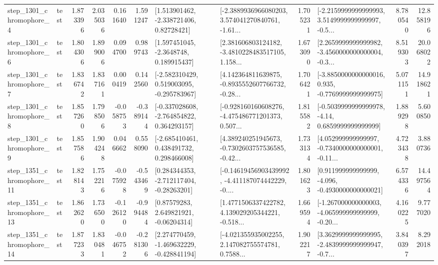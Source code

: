 \begin{tabular}{llrrrrllrlrr}
  step\_1301\_chromophore\_4 &      test &      1.873396 &    2.035036 &      0.161640 &  1.591247 &     [1.513901462, -2.338721406, 0.82728421] &  [-2.3889936966080203, 3.574041270840761, -1.61... &       1.705231 &  [-2.2159999999999993, 3.5149999999999997, -0.5... &            8.780540 &         12.858196 \\
  step\_1301\_chromophore\_6 &      test &      1.804306 &    1.899006 &      0.094700 &  0.989743 &      [1.597451045, -2.3648748, 0.189915437] &  [2.381606803124182, -3.4810228483517105, 1.158... &       1.673090 &  [2.2659999999999982, -3.4560000000000004, -0.3... &            8.519303 &         20.068022 \\
  step\_1301\_chromophore\_7 &      test &      1.836742 &    1.837161 &      0.000419 &  0.142560 &   [-2.582310429, 0.519003095, -0.295783967] &  [4.142364811639875, -0.8935552607766732, -0.28... &       1.706421 &  [-3.8850000000000016, 0.935, -0.7769999999999975] &            5.071151 &         14.918621 \\
  step\_1301\_chromophore\_8 &      test &      1.857260 &    1.798506 &     -0.058753 & -0.389144 &   [-0.337028608, -2.764854822, 0.364293157] &  [-0.928160160608276, -4.475486771201373, 0.507... &       1.815582 &   [-0.5039999999999978, -4.14, 0.6859999999999999] &            1.889298 &          5.600850 \\
  step\_1301\_chromophore\_9 &      test &      1.857586 &    1.904248 &      0.046662 &  0.558090 &    [-2.685410461, 0.438491732, 0.298466008] &  [4.389240251945673, -0.7302603757536585, -0.42... &       1.733134 &  [4.052999999999997, -0.7340000000000001, -0.11... &            4.723438 &          3.880736 \\
 step\_1351\_chromophore\_11 &      test &      1.828143 &    1.752216 &     -0.075928 & -0.543469 &    [0.284344353, -2.712117404, -0.28263201] &  [-0.14619456903439992, -4.411187074442229, -0.... &       1.801623 &   [0.911999999999999, -4.096, -0.4930000000000021] &            6.574336 &         14.497564 \\
 step\_1351\_chromophore\_13 &      test &      1.862620 &    1.736500 &     -0.126120 & -0.994484 &      [0.87579283, 2.649821921, -0.06204314] &  [1.4771506337422782, 4.139029205344221, -0.518... &       1.669594 &  [-1.267000000000003, -4.065999999999999, -0.20... &            4.160225 &          9.777020 \\
 step\_1351\_chromophore\_14 &      test &      1.877233 &    1.830481 &     -0.046752 & -0.281306 &   [2.274770459, -1.469632229, -0.428841194] &  [-4.021355935002255, 2.147082755574781, 0.7588... &       1.902217 &  [3.3629999999999995, -2.4839999999999947, -0.7... &            3.840397 &          8.292018 \\

\end{tabular}
